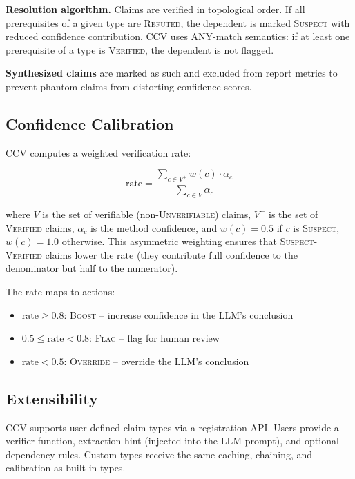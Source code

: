 \textbf{Resolution algorithm.} Claims are verified in topological order. If all prerequisites of a given type are \textsc{Refuted}, the dependent is marked \textsc{Suspect} with reduced confidence contribution. CCV uses ANY-match semantics: if at least one prerequisite of a type is \textsc{Verified}, the dependent is not flagged.

\textbf{Synthesized claims} are marked as such and excluded from report metrics to prevent phantom claims from distorting confidence scores.

\subsection{Confidence Calibration}

CCV computes a weighted verification rate:

\begin{equation}
\text{rate} = \frac{\sum_{c \in V^+} w(c) \cdot \alpha_c}{\sum_{c \in V} \alpha_c}
\label{eq:rate}
\end{equation}

where $V$ is the set of verifiable (non-\textsc{Unverifiable}) claims, $V^+$ is the set of \textsc{Verified} claims, $\alpha_c$ is the method confidence, and $w(c) = 0.5$ if $c$ is \textsc{Suspect}, $w(c) = 1.0$ otherwise. This asymmetric weighting ensures that \textsc{Suspect}-\textsc{Verified} claims lower the rate (they contribute full confidence to the denominator but half to the numerator).

The rate maps to actions:

\begin{itemize}
    \item $\text{rate} \geq 0.8$: \textsc{Boost} -- increase confidence in the LLM's conclusion
    \item $0.5 \leq \text{rate} < 0.8$: \textsc{Flag} -- flag for human review
    \item $\text{rate} < 0.5$: \textsc{Override} -- override the LLM's conclusion
\end{itemize}

\subsection{Extensibility}

CCV supports user-defined claim types via a registration API. Users provide a verifier function, extraction hint (injected into the LLM prompt), and optional dependency rules. Custom types receive the same caching, chaining, and calibration as built-in types.

